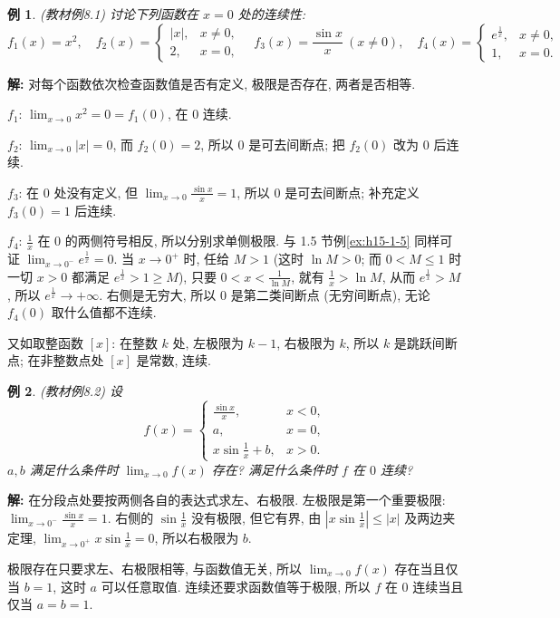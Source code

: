\documentclass[UTF8,openany]{ctexbook}
\theoremstyle{chinesetextbook}
\newtheorem{example}{例}[section]
\newenvironment{cnsolution}{\par\indent\textbf{解:} \ignorespaces}{\par}
\begin{document}
\begin{example}\label{ex:8-1}
\textnormal{(教材例8.1)} 讨论下列函数在 $x=0$ 处的连续性:
\[
f_1(x)=x^2,\quad f_2(x)=\begin{cases}|x|,&x\ne0,\\2,&x=0,\end{cases}\quad f_3(x)=\frac{\sin x}x\ (x\ne0),\quad f_4(x)=\begin{cases}e^{\frac1x},&x\ne0,\\1,&x=0.\end{cases}
\]
\end{example}
\begin{cnsolution}
对每个函数依次检查函数值是否有定义, 极限是否存在, 两者是否相等.

$f_1$: $\displaystyle\lim_{x\to0}x^2=0=f_1(0)$, 在 $0$ 连续.

$f_2$: $\displaystyle\lim_{x\to0}|x|=0$, 而 $f_2(0)=2$, 所以 $0$ 是可去间断点; 把 $f_2(0)$ 改为 $0$ 后连续.

$f_3$: 在 $0$ 处没有定义, 但 $\displaystyle\lim_{x\to0}\frac{\sin x}x=1$, 所以 $0$ 是可去间断点; 补充定义 $f_3(0)=1$ 后连续.

$f_4$: $\displaystyle\frac1x$ 在 $0$ 的两侧符号相反, 所以分别求单侧极限. 与 1.5 节例\ref{ex:h15-1-5} 同样可证 $\displaystyle\lim_{x\to0^-}e^{\frac1x}=0$. 当 $x\to0^+$ 时, 任给 $M>1$ (这时 $\ln M>0$; 而 $0<M\le1$ 时一切 $x>0$ 都满足 $e^{\frac1x}>1\ge M$), 只要 $\displaystyle0<x<\frac1{\ln M}$, 就有 $\displaystyle\frac1x>\ln M$, 从而 $e^{\frac1x}>M$, 所以 $e^{\frac1x}\to+\infty$. 右侧是无穷大, 所以 $0$ 是第二类间断点 (无穷间断点), 无论 $f_4(0)$ 取什么值都不连续.
\end{cnsolution}
又如取整函数 $[x]$: 在整数 $k$ 处, 左极限为 $k-1$, 右极限为 $k$, 所以 $k$ 是跳跃间断点; 在非整数点处 $[x]$ 是常数, 连续.
\begin{example}
\textnormal{(教材例8.2)} 设
\[
f(x)=\begin{cases}\frac{\sin x}x,&x<0,\\a,&x=0,\\x\sin\frac1x+b,&x>0.\end{cases}
\]
$a,b$ 满足什么条件时 $\displaystyle\lim_{x\to0}f(x)$ 存在? 满足什么条件时 $f$ 在 $0$ 连续?
\end{example}
\begin{cnsolution}
在分段点处要按两侧各自的表达式求左、右极限. 左极限是第一个重要极限: $\displaystyle\lim_{x\to0^-}\frac{\sin x}x=1$. 右侧的 $\displaystyle\sin\frac1x$ 没有极限, 但它有界, 由 $\displaystyle\left|x\sin\frac1x\right|\le|x|$ 及两边夹定理, $\displaystyle\lim_{x\to0^+}x\sin\frac1x=0$, 所以右极限为 $b$.

极限存在只要求左、右极限相等, 与函数值无关, 所以 $\displaystyle\lim_{x\to0}f(x)$ 存在当且仅当 $b=1$, 这时 $a$ 可以任意取值. 连续还要求函数值等于极限, 所以 $f$ 在 $0$ 连续当且仅当 $a=b=1$.
\end{cnsolution}
\end{document}
